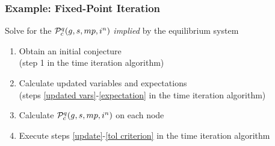 \documentclass[11pt]{beamer}
\begin{document}
\begin{frame}\frametitle{Example: Fixed-Point Iteration}

Solve for the ${\cal P}_c^q(g,s,mp,i^n)$ \textit{implied} by the equilibrium system
\begin{enumerate}
  \item<1-|handout:1> Obtain an initial conjecture\\(step 1 in the time iteration algorithm)
  \item<2-|handout:1> Calculate updated variables and expectations\\(steps \ref{updated vars}-\ref{expectation} in the time iteration algorithm)
  \item<3-|handout:1> Calculate ${\cal P}_c^q(g,s,mp,i^n)$ on each node %
  \item<4-|handout:1> Execute steps \ref{update}-\ref{tol criterion} in the time iteration algorithm
\end{enumerate}
\end{frame}

\end{document}
